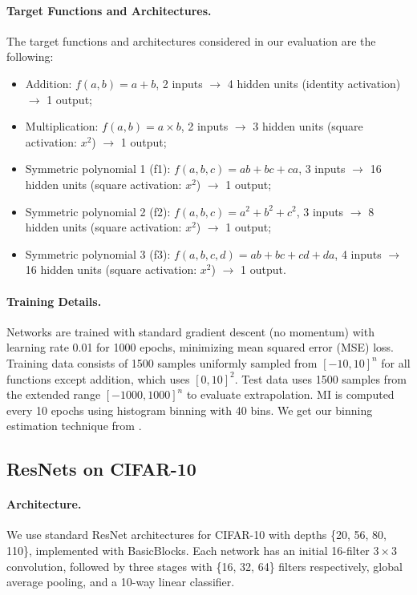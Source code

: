 \documentclass{article}
\theoremstyle{definition}
\theoremstyle{remark}
\begin{document}
\paragraph{Target Functions and Architectures.} The target functions and architectures considered in our evaluation are the following:
\begin{itemize}
    \item Addition: $f(a,b) = a + b$, 2 inputs $\rightarrow$ 4 hidden units (identity activation) $\rightarrow$ 1 output;
    \item Multiplication: $f(a,b) = a \times b$, 2 inputs $\rightarrow$ 3 hidden units (square activation: $x^2$) $\rightarrow$ 1 output;
    \item Symmetric polynomial 1 (f1): $f(a,b,c) = ab + bc + ca$, 3 inputs $\rightarrow$ 16 hidden units (square activation: $x^2$) $\rightarrow$ 1 output;
    \item Symmetric polynomial 2 (f2): $f(a,b,c) = a^2 + b^2 + c^2$, 3 inputs $\rightarrow$ 8 hidden units (square activation: $x^2$) $\rightarrow$ 1 output;
    \item Symmetric polynomial 3 (f3): $f(a,b,c,d) = ab + bc + cd + da$, 4 inputs $\rightarrow$ 16 hidden units (square activation: $x^2$) $\rightarrow$ 1 output.
\end{itemize}

\paragraph{Training Details.} Networks are trained with standard gradient descent (no momentum) with learning rate 0.01 for 1000 epochs, minimizing mean squared error (MSE) loss. Training data consists of 1500 samples uniformly sampled from $[-10, 10]^n$ for all functions except addition, which uses $[0, 10]^2$. Test data uses 1500 samples from the extended range $[-1000, 1000]^n$ to evaluate extrapolation. MI is computed every 10 epochs using histogram binning with 40 bins. We get our binning estimation technique from \cite{saxe2018}.

\subsection{ResNets on CIFAR-10}
\label{app:resnets}

\paragraph{Architecture.} We use standard ResNet architectures for CIFAR-10 with depths \{20, 56, 80, 110\}, implemented with BasicBlocks. Each network has an initial 16-filter $3\times3$ convolution, followed by three stages with \{16, 32, 64\} filters respectively, global average pooling, and a 10-way linear classifier.
\end{document}
